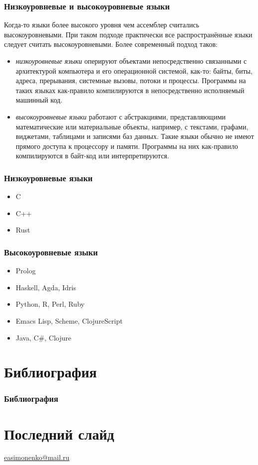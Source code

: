 \documentclass[9pt,pdf]{beamer}
\begin{document}
\begin{frame}
	\frametitle{Низкоуровневые и высокоуровневые языки}
	Когда-то языки более высокого уровня чем ассемблер считались высокоуровневыми. При таком подходе практически все распространённые языки следует считать высокоуровневыми. Более современный подход таков:
	\begin{itemize}
		\item \textit{низкоуровневые языки} оперируют объектами непосредственно связанными с архитектурой компьютера и его операционной системой, как-то: байты, биты, адреса, прерывания, системные вызовы, потоки и процессы. Программы на таких языках как-правило компилируются в непосредственно исполняемый машинный код.
		\item \textit{высокоуровневые языки} работают с абстракциями, представляющими математические или материальные объекты, например, с текстами, графами, виджетами, таблицами и записями баз данных. Такие языки обычно не имеют прямого доступа к процессору и памяти. Программы на них как-правило компилируются в байт-код или интерпретируются.
	\end{itemize}
\end{frame}

\begin{frame}
	\frametitle{Низкоуровневые языки}
	\begin{itemize}
		\item C
		\item C++
		\item Rust
	\end{itemize}
\end{frame}

\begin{frame}
	\frametitle{Высокоуровневые языки}
	\begin{itemize}
		\item Prolog
		\item Haskell, Agda, Idris
		\item Python, R, Perl, Ruby
		\item Emacs Lisp, Scheme, ClojureScript
		\item Java, C\#, Clojure
	\end{itemize}
\end{frame}

\section{Библиография}

\begin{frame}
	\frametitle{Библиография}
	\printbibliography
\end{frame}

\section*{Последний слайд}

\begin{frame}
\center

\textbf{\textsl{\inserttitle}}

\textsl{\insertsubtitle}

\insertauthor

\url{easimonenko@mail.ru}
\end{frame}
\end{document}
